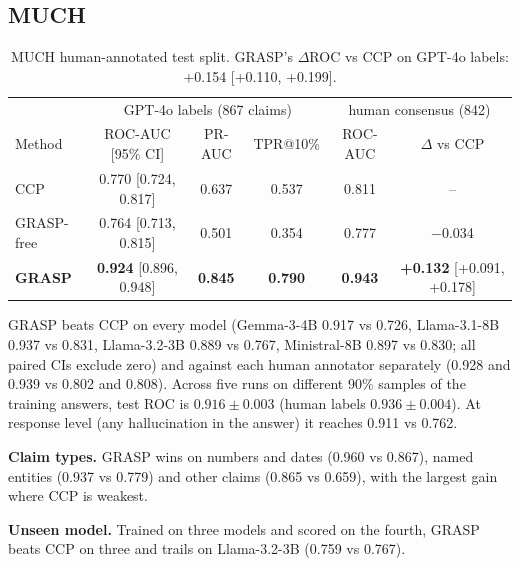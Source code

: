 \documentclass[11pt]{article}
\begin{document}
\subsection{MUCH}
\begin{table}[t]
\centering\small
\begin{tabular}{lccccc}
\toprule
 & \multicolumn{3}{c}{GPT-4o labels (867 claims)} & \multicolumn{2}{c}{human consensus (842)} \\
Method & ROC-AUC [95\% CI] & PR-AUC & TPR@10\% & ROC-AUC & $\Delta$ vs CCP \\
\midrule
CCP & 0.770 [0.724, 0.817] & 0.637 & 0.537 & 0.811 & -- \\
GRASP-free & 0.764 [0.713, 0.815] & 0.501 & 0.354 & 0.777 & $-$0.034 \\
\textbf{GRASP} & \textbf{0.924} [0.896, 0.948] & \textbf{0.845} & \textbf{0.790} & \textbf{0.943} & \textbf{+0.132} [+0.091, +0.178] \\
\bottomrule
\end{tabular}
\caption{MUCH human-annotated test split. GRASP's $\Delta$ROC vs CCP on GPT-4o labels: +0.154 [+0.110, +0.199].}
\label{tab:main}
\end{table}
GRASP beats CCP on every model (Gemma-3-4B 0.917 vs 0.726, Llama-3.1-8B 0.937 vs 0.831, Llama-3.2-3B
0.889 vs 0.767, Ministral-8B 0.897 vs 0.830; all paired CIs exclude zero) and against each human
annotator separately (0.928 and 0.939 vs 0.802 and 0.808). Across five runs on different 90\% samples
of the training answers, test ROC is $0.916\pm0.003$ (human labels $0.936\pm0.004$). At response level
(any hallucination in the answer) it reaches 0.911 vs 0.762.

\textbf{Claim types.} GRASP wins on numbers and dates (0.960 vs 0.867), named entities (0.937 vs 0.779)
and other claims (0.865 vs 0.659), with the largest gain where CCP is weakest.

\textbf{Unseen model.} Trained on three models and scored on the fourth, GRASP beats CCP on three and
trails on Llama-3.2-3B (0.759 vs 0.767).
\end{document}
